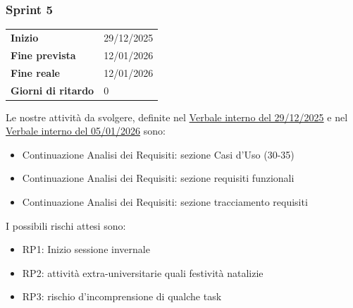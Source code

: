 \subsubsection{Sprint 5}


\begin{tabular}{p{} p{}}
	\textbf{Inizio} & 29/12/2025 \\
	\textbf{Fine prevista} & 12/01/2026 \\
	\textbf{Fine reale} &  12/01/2026\\
	\textbf{Giorni di ritardo} & 0
\end{tabular}
\newline \newline 
Le nostre attività da svolgere, definite nel \href{https://nullpointersgroup.github.io/Documentazione/output/RTB/Verbali%20Interni/2025-12-29_verbale_interno.pdf}{Verbale interno del 29/12/2025} e nel \href{https://nullpointersgroup.github.io/Documentazione/output/RTB/Verbali%20Interni/2026-01-05_verbale_interno.pdf}{Verbale interno del 05/01/2026} sono:
\begin{itemize}[itemsep=5pt, parsep=1pt, label=$\scriptstyle\bullet$]
	\item Continuazione Analisi dei Requisiti: sezione Casi d’Uso (30-35)
	\item Continuazione Analisi dei Requisiti: sezione requisiti funzionali
	\item Continuazione Analisi dei Requisiti: sezione tracciamento requisiti
\end{itemize}

I possibili rischi attesi sono:
\begin{itemize}[itemsep=5pt, parsep=1pt, label=$\scriptstyle\bullet$]
	\item RP1: Inizio sessione invernale
	\item RP2: attività extra-universitarie quali festività natalizie
	\item RP3: rischio d'incomprensione di qualche task
\end{itemize}

